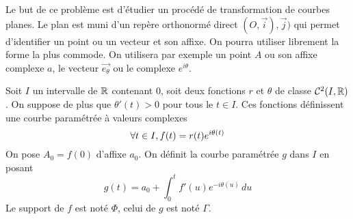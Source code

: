 Le but de ce problème est d'étudier un procédé de transformation de courbes planes.\newline
Le plan est muni d'un repère orthonormé direct $(O,\overrightarrow{i}),\overrightarrow{j})$ qui permet d'identifier un point ou un vecteur et son affixe. On pourra utiliser librement la forme la plus commode. On utilisera par exemple un point $A$ ou son affixe complexe $a$, le vecteur $\overrightarrow{e_{\theta}}$ ou le complexe $e^{i\theta}$.


Soit $I$ un intervalle de $\mathbb{R}$ contenant 0, soit deux fonctions $r$ et $\theta$ de classe $\mathcal{C}^2(I,\mathbb{R})$. On suppose de plus que $\theta'(t)>0$ pour tous le $t\in I$. Ces fonctions définissent une courbe paramétrée à valeurs complexes
\[\forall t \in I ,\medskip  f(t)=r(t)e^{i\theta(t)}\]
On pose $A_0=f(0)$ d'affixe $a_0$.\newline
On définit la courbe paramétrée $g$ dans $I$ en posant
\[g(t)=a_0+\int_{0}^{t}f'(u)e^{-i\theta(u)}\,du\]
Le support de $f$ est noté $\Phi$, celui de $g$ est noté $\Gamma$.
